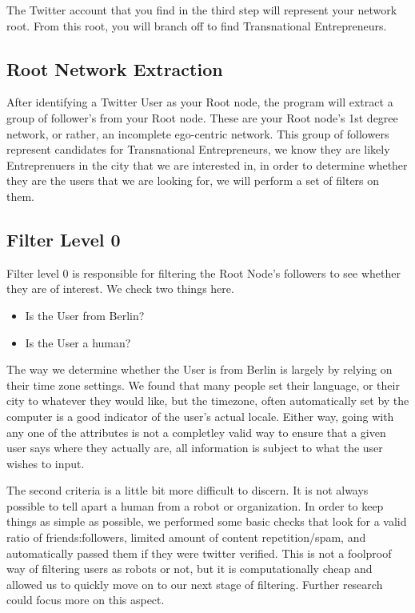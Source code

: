 The Twitter account that you find in the third step will represent your network root. From this root, you will branch off to find Transnational Entrepreneurs.

\subsection{Root Network Extraction}
After identifying a Twitter User as your Root node, the program will extract a group of follower's from your Root node. These are your Root node's 1st degree network, or rather, an incomplete ego-centric network. This group of followers represent candidates for Transnational Entrepreneurs, we know they are likely Entreprenuers in the city that we are interested in, in order to determine whether they are the users that we are looking for, we will perform a set of filters on them.

\subsection{Filter Level 0}
Filter level 0 is responsible for filtering the Root Node's followers to see whether they are of interest. We check two things here.

\begin{itemize}
\item Is the User from Berlin?
\item Is the User a human?
\end{itemize}

The way we determine whether the User is from Berlin is largely by relying on their time zone settings. We found that many people set their language, or their city to whatever they would like, but the timezone, often automatically set by the computer is a good indicator of the user's actual locale. Either way, going with any one of the attributes is not a completley valid way to ensure that a given user says where they actually are, all information is subject to what the user wishes to input.
\par
The second criteria is a little bit more difficult to discern. It is not always possible to tell apart a human from a robot or organization. In order to keep things as simple as possible, we performed some basic checks that look for a valid ratio of friends:followers, limited amount of content repetition/spam, and automatically passed them if they were twitter verified. This is not a foolproof way of filtering users as robots or not, but it is computationally cheap and allowed us to quickly move on to our next stage of filtering. Further research could focus more on this aspect.


